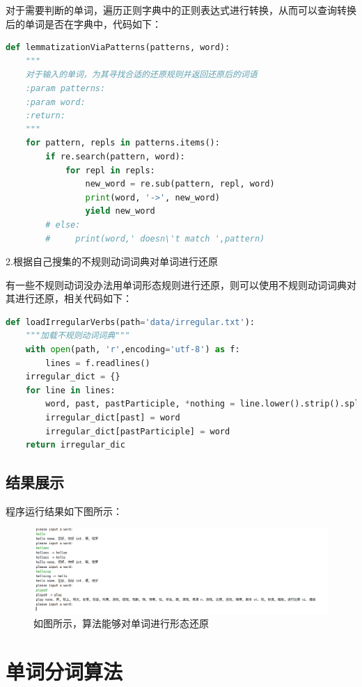 \documentclass[UTF8]{ctexart}  %
\begin{document}
对于需要判断的单词，遍历正则字典中的正则表达式进行转换，从而可以查询转换后的单词是否在字典中，代码如下：
\begin{lstlisting}[language=python]
def lemmatizationViaPatterns(patterns, word):
	"""
	对于输入的单词，为其寻找合适的还原规则并返回还原后的词语
	:param patterns:
	:param word:
	:return:
	"""
	for pattern, repls in patterns.items():
		if re.search(pattern, word):
			for repl in repls:
				new_word = re.sub(pattern, repl, word)
				print(word, '->', new_word)
				yield new_word
		# else:
		#     print(word,' doesn\'t match ',pattern)

\end{lstlisting}

2.根据自己搜集的不规则动词词典对单词进行还原

有一些不规则动词没办法用单词形态规则进行还原，则可以使用不规则动词词典对其进行还原，相关代码如下：


\begin{lstlisting}[language=python]
def loadIrregularVerbs(path='data/irregular.txt'):
	"""加载不规则动词词典"""
	with open(path, 'r',encoding='utf-8') as f:
		lines = f.readlines()
	irregular_dict = {}
	for line in lines:
		word, past, pastParticiple, *nothing = line.lower().strip().split(',')
		irregular_dict[past] = word
		irregular_dict[pastParticiple] = word
	return irregular_dic

\end{lstlisting}

\subsection{结果展示}
程序运行结果如下图所示：
\begin{figure}[!ht]\centering   %
	\includegraphics[scale=0.5]{imgs/test.png}    %
	\caption{如图所示，算法能够对单词进行形态还原\label{fig:形态还原展示}}  %
\end{figure}


\newpage

\section{单词分词算法}
\end{document}

